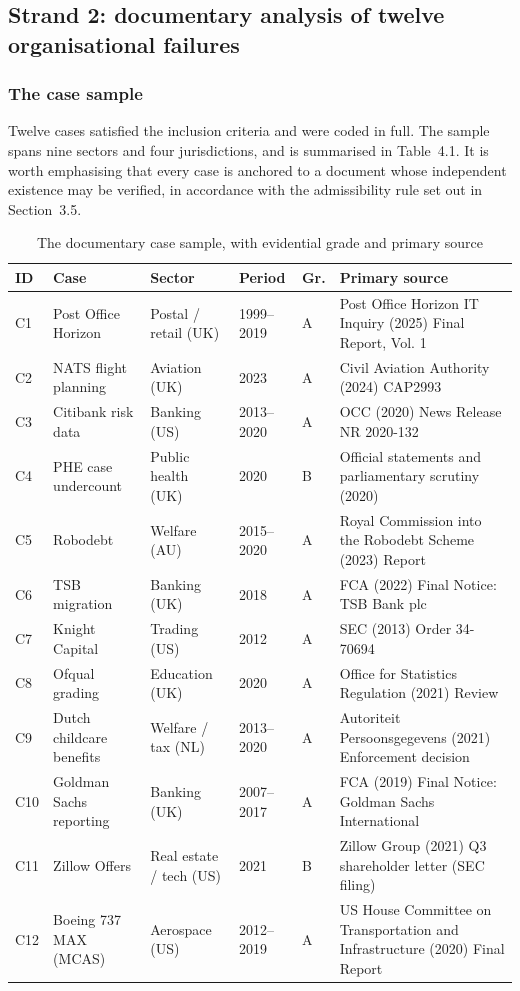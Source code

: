 \documentclass[11pt,a4paper]{article}
\numberwithin{figure}{section}
\numberwithin{table}{section}
\newcommand{\xref}[1]{\textcolor{citeblue}{#1}}         %
\begin{document}
\subsection{Strand 2: documentary analysis of twelve organisational failures}

\subsubsection{The case sample}

Twelve cases satisfied the inclusion criteria and were coded in full. The sample spans nine
sectors and four jurisdictions, and is summarised in \xref{Table~4.1}. It is worth emphasising that
every case is anchored to a document whose independent existence may be verified, in accordance
with the admissibility rule set out in \xref{Section~3.5}.

\begin{table}[H]
\centering\footnotesize
\caption{The documentary case sample, with evidential grade and primary source}
\label{tab:cases}
\begin{tabularx}{\textwidth}{@{}p{0.7cm} p{3.0cm} p{2.6cm} p{1.5cm} p{0.7cm} X@{}}
\toprule
\textbf{ID} & \textbf{Case} & \textbf{Sector} & \textbf{Period} & \textbf{Gr.} & \textbf{Primary source} \\
\midrule
C1 & Post Office Horizon & Postal / retail (UK) & 1999–2019 & A & Post Office Horizon IT Inquiry (2025) Final Report, Vol. 1 \\
C2 & NATS flight planning & Aviation (UK) & 2023 & A & Civil Aviation Authority (2024) CAP2993 \\
C3 & Citibank risk data & Banking (US) & 2013–2020 & A & OCC (2020) News Release NR 2020-132 \\
C4 & PHE case undercount & Public health (UK) & 2020 & B & Official statements and parliamentary scrutiny (2020) \\
C5 & Robodebt & Welfare (AU) & 2015–2020 & A & Royal Commission into the Robodebt Scheme (2023) Report \\
C6 & TSB migration & Banking (UK) & 2018 & A & FCA (2022) Final Notice: TSB Bank plc \\
C7 & Knight Capital & Trading (US) & 2012 & A & SEC (2013) Order 34-70694 \\
C8 & Ofqual grading & Education (UK) & 2020 & A & Office for Statistics Regulation (2021) Review \\
C9 & Dutch childcare benefits & Welfare / tax (NL) & 2013–2020 & A & Autoriteit Persoonsgegevens (2021) Enforcement decision \\
C10 & Goldman Sachs reporting & Banking (UK) & 2007–2017 & A & FCA (2019) Final Notice: Goldman Sachs International \\
C11 & Zillow Offers & Real estate / tech (US) & 2021 & B & Zillow Group (2021) Q3 shareholder letter (SEC filing) \\
C12 & Boeing 737 MAX (MCAS) & Aerospace (US) & 2012–2019 & A & US House Committee on Transportation and Infrastructure (2020) Final Report \\
\bottomrule
\end{tabularx}
\end{table}
\end{document}

